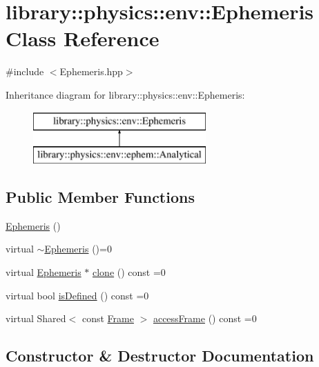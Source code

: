 \hypertarget{classlibrary_1_1physics_1_1env_1_1_ephemeris}{}\section{library\+:\+:physics\+:\+:env\+:\+:Ephemeris Class Reference}
\label{classlibrary_1_1physics_1_1env_1_1_ephemeris}


{\ttfamily \#include $<$Ephemeris.\+hpp$>$}

Inheritance diagram for library\+:\+:physics\+:\+:env\+:\+:Ephemeris\+:\begin{figure}[H]
\begin{center}
\leavevmode
\includegraphics[height=2.000000cm]{classlibrary_1_1physics_1_1env_1_1_ephemeris}
\end{center}
\end{figure}
\subsection*{Public Member Functions}
\begin{DoxyCompactItemize}
\item 
\hyperlink{classlibrary_1_1physics_1_1env_1_1_ephemeris_a99282f212b17cc6a4eb63f99e6b16f69}{Ephemeris} ()
\item 
virtual \hyperlink{classlibrary_1_1physics_1_1env_1_1_ephemeris_af2459c2cc219c926f18e540fd0ebbaac}{$\sim$\+Ephemeris} ()=0
\item 
virtual \hyperlink{classlibrary_1_1physics_1_1env_1_1_ephemeris}{Ephemeris} $\ast$ \hyperlink{classlibrary_1_1physics_1_1env_1_1_ephemeris_a7ddecd88d91f79ff204100eb9607b591}{clone} () const =0
\item 
virtual bool \hyperlink{classlibrary_1_1physics_1_1env_1_1_ephemeris_abf61a03e24dd146199381db14d1d7c68}{is\+Defined} () const =0
\item 
virtual Shared$<$ const \hyperlink{classlibrary_1_1physics_1_1coord_1_1_frame}{Frame} $>$ \hyperlink{classlibrary_1_1physics_1_1env_1_1_ephemeris_ac832f493239ace4d53c1c5130c1dad31}{access\+Frame} () const =0
\end{DoxyCompactItemize}


\subsection{Constructor \& Destructor Documentation}
\mbox{\label{classlibrary_1_1physics_1_1env_1_1_ephemeris_a99282f212b17cc6a4eb63f99e6b16f69}} 
